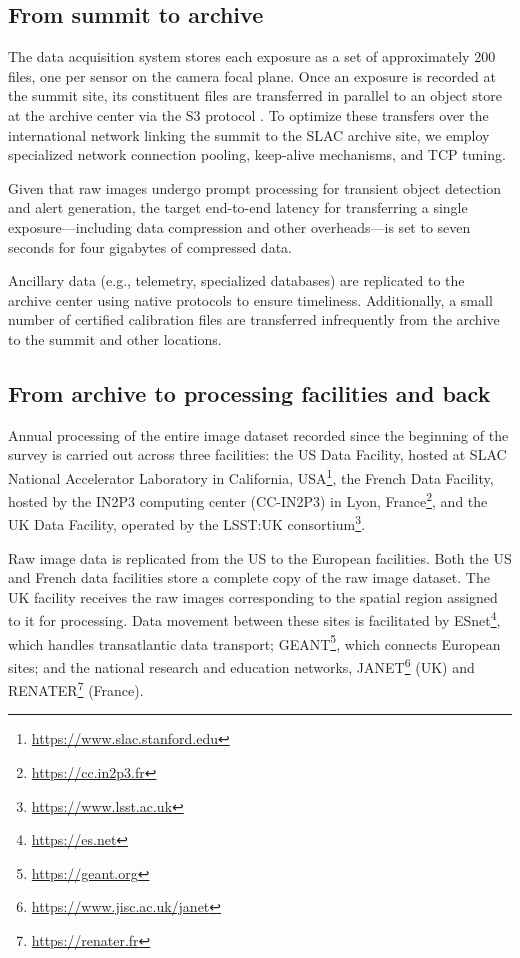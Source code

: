 \documentclass{webofc}
\begin{document}
\subsection{From summit to archive}
\label{summit-to-archive}

The data acquisition system stores each exposure as a set of approximately 200 files, one per sensor on the camera focal plane. Once an exposure is recorded at the summit site, its constituent files are transferred in parallel to an object store at the archive center via the S3 protocol \cite{s3}. To optimize these transfers over the international network linking the summit to the SLAC archive site, we employ specialized network connection pooling, keep-alive mechanisms, and TCP tuning.

Given that raw images undergo prompt processing for transient object detection and alert generation, the target end-to-end latency for transferring a single exposure—including data compression and other overheads—is set to seven seconds for four gigabytes of compressed data.

Ancillary data (e.g., telemetry, specialized databases) are replicated to the archive center using native protocols to ensure timeliness. Additionally, a small number of certified calibration files are transferred infrequently from the archive to the summit and other locations.

\subsection{From archive to processing facilities and back}
\label{summit-to-data-facilities}

Annual processing of the entire image dataset recorded since the beginning of the survey is carried out across three facilities: the US Data Facility, hosted at SLAC National Accelerator Laboratory in California, USA\footnote{\url{https://www.slac.stanford.edu}}, the French Data Facility, hosted by the IN2P3 computing center (CC-IN2P3) in Lyon, France\footnote{\url{https://cc.in2p3.fr}}, and the UK Data Facility, operated by the LSST:UK consortium\footnote{\url{https://www.lsst.ac.uk}}.

Raw image data is replicated from the US to the European facilities. Both the US and French data facilities store a complete copy of the raw image dataset. The UK facility receives the raw images corresponding to the spatial region assigned to it for processing. Data movement between these sites is facilitated by ESnet\footnote{\url{https://es.net}}, which handles transatlantic data transport; GEANT\footnote{\url{https://geant.org}}, which connects European sites; and the national research and education networks, JANET\footnote{\url{https://www.jisc.ac.uk/janet}} (UK) and RENATER\footnote{\url{https://renater.fr}} (France).
\end{document}

